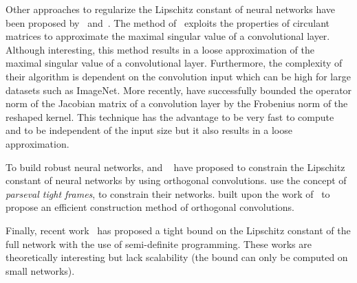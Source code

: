 Other approaches to regularize the Lipschitz constant of neural networks have been proposed by~\citet{sedghi2018singular} and~\citet{singla2019bounding}.
The method of~\citet{sedghi2018singular} exploits the properties of circulant matrices to approximate the maximal singular value of a convolutional layer.
Although interesting, this method results in a loose approximation of the maximal singular value of a convolutional layer.
Furthermore, the complexity of their algorithm is dependent on the convolution input which can be high for large datasets such as ImageNet.
More recently, \citet{singla2019bounding} have successfully bounded the operator norm of the Jacobian matrix of a convolution layer by the Frobenius norm of the reshaped kernel.
This technique has the advantage to be very fast to compute and to be independent of the input size but it also results in a loose approximation. 

To build robust neural networks, \citet{cisse2017parseval} and ~\citet{NIPS2019_9673} have proposed to constrain the Lipschitz constant of neural networks by using orthogonal convolutions.
\citet{cisse2017parseval} use the concept of \emph{parseval tight frames}, to constrain their networks.
\citet{NIPS2019_9673} built upon the work of~\citet{cisse2017parseval} to propose an efficient construction method of orthogonal convolutions.  

Finally, recent work~\citet{NIPS2019_9319,latorre2020lipschitz} has proposed a tight bound on the Lipschitz constant of the full network with the use of semi-definite programming.
These works are theoretically interesting but lack scalability (\ie the bound can only be computed on small networks).



